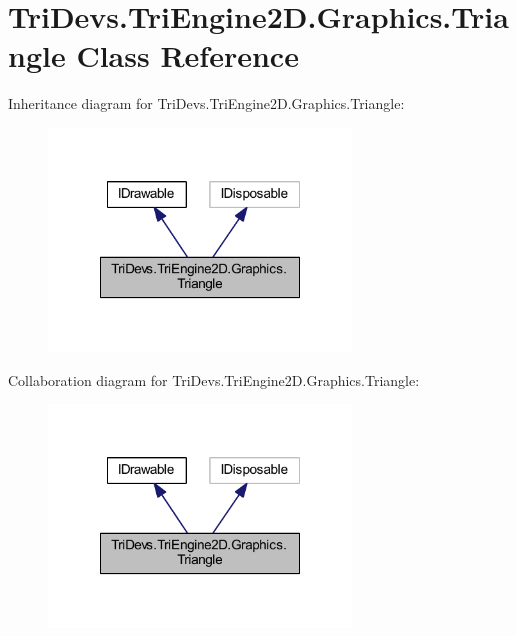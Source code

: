 \hypertarget{class_tri_devs_1_1_tri_engine2_d_1_1_graphics_1_1_triangle}{\section{Tri\-Devs.\-Tri\-Engine2\-D.\-Graphics.\-Triangle Class Reference}
\label{class_tri_devs_1_1_tri_engine2_d_1_1_graphics_1_1_triangle}
}


Inheritance diagram for Tri\-Devs.\-Tri\-Engine2\-D.\-Graphics.\-Triangle\-:
\nopagebreak
\begin{figure}[H]
\begin{center}
\leavevmode
\includegraphics[width=228pt]{class_tri_devs_1_1_tri_engine2_d_1_1_graphics_1_1_triangle__inherit__graph}
\end{center}
\end{figure}


Collaboration diagram for Tri\-Devs.\-Tri\-Engine2\-D.\-Graphics.\-Triangle\-:
\nopagebreak
\begin{figure}[H]
\begin{center}
\leavevmode
\includegraphics[width=228pt]{class_tri_devs_1_1_tri_engine2_d_1_1_graphics_1_1_triangle__coll__graph}
\end{center}
\end{figure}

